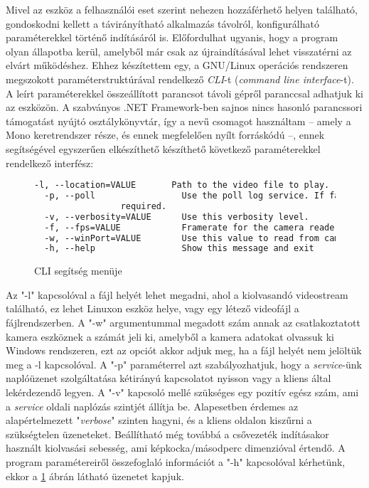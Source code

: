Mivel az eszköz a felhasználói eset szerint nehezen hozzáférhető helyen található, gondoskodni kellett a távirányítható alkalmazás távolról, konfigurálható paraméterekkel történő indításáról is. Előfordulhat ugyanis, hogy a program olyan állapotba kerül, amelyből már csak az újraindításával lehet visszatérni az elvárt működéshez. Ehhez készítettem egy, a GNU/Linux operációs rendszeren megszokott paraméterstruktúrával rendelkező \emph{CLI}-t (\emph{command line interface}-t). A leírt paraméterekkel összeállított parancsot távoli gépről  paranccsal adhatjuk ki az eszközön. A szabványos .NET Framework-ben sajnos nincs hasonló parancssori támogatást nyújtó osztálykönyvtár, így a   nevű csomagot használtam -- amely a Mono keretrendszer része, és ennek megfelelően nyílt forráskódú --, ennek segítségével egyszerűen elkészíthető készíthető következő paraméterekkel rendelkező interfész:

\begin{figure}[h]
\centering
\begin{minipage}{1\textwidth}
\begin{mdframed}[backgroundcolor=gray!20]
\begin{scriptsize}
\begin{lstlisting}[language=xml]
  -l, --location=VALUE       Path to the video file to play.
  -p, --poll                 Use the poll log service. If false, duplex binding is
  			     required.
  -v, --verbosity=VALUE      Use this verbosity level.
  -f, --fps=VALUE            Framerate for the camera reader.
  -w, --winPort=VALUE		 Use this value to read from camera port on Windows
  -h, --help                 Show this message and exit
\end{lstlisting}
\end{scriptsize}
\end{mdframed}
\end{minipage}
\caption{CLI segítség menüje} \label{figure:cli_help}
\end{figure}

Az "-l" kapcsolóval a fájl helyét lehet megadni, ahol a kiolvasandó videostream található, ez lehet Linuxon eszköz helye, vagy egy létező videofájl a fájlrendszerben.
A "-w" argumentummal megadott szám annak az csatlakoztatott kamera eszköznek a számát jeli ki, amelyből a kamera adatokat olvassuk ki Windows rendszeren, ezt az opciót akkor adjuk meg, ha a fájl helyét nem jelöltük meg a -l kapcsolóval.
A "-p" paraméterrel azt szabályozhatjuk, hogy a \emph{service}-ünk naplóüzenet szolgáltatása kétirányú kapcsolatot nyisson vagy a kliens által lekérdezendő legyen.
A "-v" kapcsoló mellé szükséges egy pozitív egész szám, ami a \emph{service} oldali naplózás szintjét állítja be. Alapesetben érdemes az alapértelmezett "\emph{verbose}" szinten hagyni, és a kliens oldalon kiszűrni a szükségtelen üzeneteket. 
Beállítható még továbbá a csővezeték indításakor használt kiolvasási sebesség, ami képkocka/másodperc dimenzióval értendő.
A program paramétereiről összefoglaló információt a "-h" kapcsolóval kérhetünk, ekkor a \ref{figure:cli_help} ábrán látható üzenetet kapjuk.

